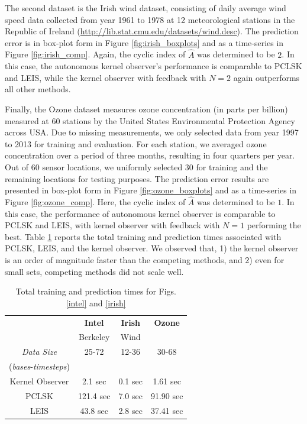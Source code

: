 \documentclass[letterpaper,12pt,peerreviewca,draftcls]{IEEEtran}
\newcommand{\nsamp}{N}
\newcommand{\dualop}{A}
\newcommand{\dualopApprox}{\widehat{\dualop}}
\begin{document}
The second dataset is the Irish wind dataset, consisting of daily average
wind speed %
data collected from year
1961 to 1978 at 12 meteorological stations in the Republic
of Ireland ({\url{http://lib.stat.cmu.edu/datasets/wind.desc}}). The prediction error  is in box-plot form in Figure \ref{fig:irish_boxplots} and as a time-series in Figure \ref{fig:irish_comp}. Again, the cyclic index of $\dualopApprox$ was determined to be $2$. In this case, the autonomous kernel observer's performance is comparable to PCLSK and LEIS, while the kernel observer with feedback with $\nsamp = 2$ again outperforms all other methods. 

Finally, the Ozone dataset measures ozone concentration (in parts per billion) measured at 60 stations by the United States Environmental Protection Agency \cite{li2006spatiotemporal} across USA. Due to missing measurements, we only selected data from
year 1997 to 2013 for training and evaluation. For each station, we averaged ozone concentration over a period of three months, resulting in four quarters per year.
Out of 60 sensor locations, we uniformly selected 30 for training and the remaining locations for testing purposes. The prediction error results are presented in box-plot form in Figure \ref{fig:ozone_boxplots} and as a time-series in Figure \ref{fig:ozone_comp}. Here, the cyclic index of $\dualopApprox$ was determined to be $1$. In this case, the performance of autonomous kernel observer is comparable to PCLSK and LEIS, with kernel observer with feedback with $\nsamp = 1$ performing the best. Table \ref{tab:timing} reports the total training and prediction times associated with PCLSK, LEIS, and the kernel observer. We observed that, 1) the kernel observer is an order of magnitude faster than the competing methods, and 2) even for small sets, competing methods did not scale well.


\begin{table}[h]
	\centering
	\caption{Total training and prediction times for Figs. \ref{intel} and \ref{irish} } \label{tab:timing}
		\begin{tabular}{c|ccc}
		\toprule
			{\bf }  & {\bf Intel } & {\bf Irish } &  {\bf Ozone}  \\
			& Berkeley & Wind & \\
			\midrule
			\emph{Data Size}        & 25-72 & 12-36  & {30-68} \\ 
		    (\emph{bases}-\emph{timesteps})                 &       & & \\ \hline
			Kernel Observer         & 2.1 sec & 0.1 sec & 1.61 sec \\
			PCLSK             & 121.4 sec & 7.0 sec & 91.90 sec \\
			LEIS             & 43.8 sec & 2.8 sec & 37.41 sec\\
		\bottomrule
		\end{tabular}
\end{table}
\end{document}
